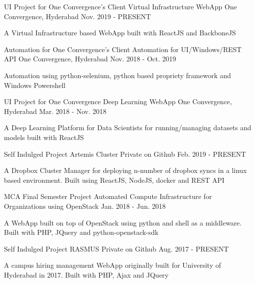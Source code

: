\begin{cventries}
  \cventry
    {UI Project for One Convergence's Client}
    {Virtual Infrastructure WebApp}
    {One Convergence, Hyderabad}
    {Nov. 2019 - PRESENT}
    {
      \begin{cvitems}
        \item {A Virtual Infrastructure based WebApp built with ReactJS and BackboneJS}
      \end{cvitems}
    }
  \cventry
    {Automation for One Convergence's Client}
    {Automation for UI/Windows/REST API}
    {One Convergence, Hyderabad}
    {Nov. 2018 - Oct. 2019}
    {
      \begin{cvitems}
        \item {Automation using python-selenium, python based propriety framework and Windows Powershell}
      \end{cvitems}
    }
  \cventry
    {UI Project for One Convergence}
    {Deep Learning WebApp}
    {One Convergence, Hyderabad}
    {Mar. 2018 - Nov. 2018}
    {
      \begin{cvitems}
        \item {A Deep Learning Platform for Data Scientists for running/managing datasets and models built with ReactJS}
      \end{cvitems}
    }
  \cventry
    {Self Indulged Project}
    {Artemis Cluster}
    {Private on Github}
    {Feb. 2019 - PRESENT}
    {
      \begin{cvitems}
        \item {A Dropbox Cluster Manager for deploying n-number of dropbox syncs in a linux based environment. Built using ReactJS, NodeJS, docker and REST API}
      \end{cvitems}
    }
  \cventry
    {MCA Final Semester Project}
    {Automated Compute Infrastructure for Organizations using OpenStack}
    {}
    {Jan. 2018 - Jun. 2018}
    {
      \begin{cvitems}
        \item {A WebApp built on top of OpenStack using python and shell as a middleware. Built with PHP, JQuery and python-openstack-sdk}
      \end{cvitems}
    }
  \cventry
    {Self Indulged Project}
    {RASMUS}
    {Private on Github}
    {Aug. 2017 - PRESENT}
    {
      \begin{cvitems}
        \item {A campus hiring management WebApp originally built for University of Hyderabad in 2017. Built with PHP, Ajax and JQuery}
      \end{cvitems}
    }
\end{cventries}
